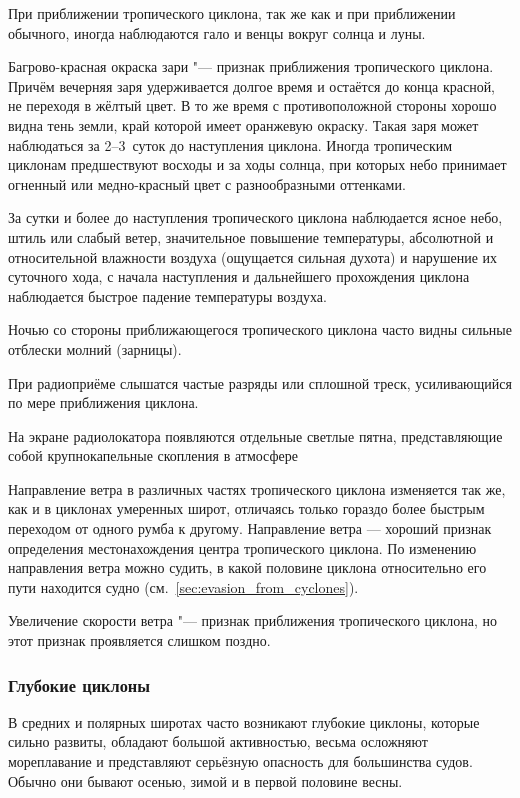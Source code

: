  При приближении тропического циклона, так же как и при
приближении обычного, иногда наблюдаются гало и венцы вокруг солнца и
луны.

 Багрово-красная окраска зари "--- признак приближения тропического
циклона. Причём вечерняя заря удерживается долгое время и остаётся до
конца красной, не переходя в жёлтый цвет. В то же время с
противоположной стороны хорошо видна тень земли, край которой имеет
оранжевую окраску. Такая заря может наблюдаться за 2--3~суток до
наступления циклона. Иногда тропическим циклонам предшествуют восходы
и за ходы солнца, при которых небо принимает огненный или
медно-красный цвет с разнообразными оттенками.

 За сутки и более до наступления тропического циклона
наблюдается ясное небо, штиль или слабый ветер, значительное повышение
температуры, абсолютной и относительной влажности воздуха (ощущается
сильная духота) и нарушение их суточного хода, с начала наступления и
дальнейшего прохождения циклона наблюдается быстрое падение
температуры воздуха.

 Ночью со стороны приближающегося тропического циклона часто видны
сильные отблески молний (зарницы).

 При радиоприёме слышатся частые разряды или сплошной треск,
усиливающийся по мере приближения циклона.

 На экране радиолокатора появляются отдельные светлые пятна,
представляющие собой крупнокапельные скопления в атмосфере

 Направление ветра в различных частях тропического циклона
изменяется так же, как и в циклонах умеренных широт, отличаясь только
гораздо более быстрым переходом от одного румба к другому. Направление
ветра — хороший признак определения местонахождения центра
тропического циклона. По изменению направления ветра можно судить, в
какой половине циклона относительно его пути находится судно
(см.~\ref{sec:evasion_from_cyclones}).

 Увеличение скорости ветра "--- признак приближения тропического
циклона, но этот признак проявляется слишком поздно.

\subsubsection{Глубокие циклоны}

В средних и полярных широтах часто возникают глубокие циклоны, которые
сильно развиты, обладают большой активностью, весьма осложняют
мореплавание и представляют серьёзную опасность для большинства
судов. Обычно они бывают осенью, зимой и в первой половине весны.

